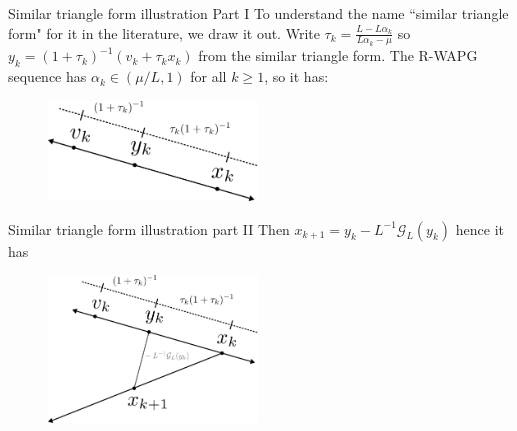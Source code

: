 \documentclass[11pt]{beamer}
\theoremstyle{definition}
\begin{document}
        \begin{frame}{Similar triangle form illustration Part I}
            To understand the name ``similar triangle form" for it in the literature, we draw it out. 
            Write $\tau_k = \frac{L - L\alpha_k}{L\alpha_k - \mu}$ so $y_k = (1 + \tau_k)^{-1}(v_k + \tau_k x_k)$ from the similar triangle form. 
            The R-WAPG sequence has $\alpha_k \in (\mu/L, 1)$ for all $k \ge 1$, so it has: 
            \begin{tcolorbox}
                \begin{figure}
                    \centering
                    \includegraphics[width=15em]{assets/st_part1.png}
                \end{figure}
            \end{tcolorbox}
        \end{frame}
        \begin{frame}{Similar triangle form illustration part II}
            Then $x_{k + 1} = y_k - L^{-1}\mathcal G_L(y_k)$ hence it has 
            \begin{tcolorbox}
                \begin{figure}
                    \centering
                    \includegraphics[width=15em]{assets/st_part2.png}
                \end{figure}
            \end{tcolorbox}
        \end{frame}
\end{document}
